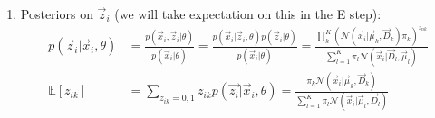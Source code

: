 \documentclass[12pt,twoside]{article}
\begin{document}
\begin{enumerate}
\item Posteriors on $\vec{z}_i$  (we will take expectation on this in the E step):
\begin{align*}
p(\vec{z}_i \vert \vec{x}_i, \theta)
&= \frac{p(\vec{x}_i, \vec{z}_i \vert \theta)}{p(\vec{x}_i \vert \theta)}
= \frac{p(\vec{x}_i\vert \vec{z}_i, \theta)p(\vec{z}_i \vert \theta)}{p(\vec{x}_i \vert \theta)}
= \frac{\prod_k^K \left(\mathcal{N}(\vec{x}_i \vert \vec{\mu}_k, \vec{D}_k)\pi_k\right)^{z_{nk}}}{\sum_{l =1}^K \pi_l \mathcal{N}(\vec{x}_i \vert \vec{D}_l, \vec{\mu}_l)}\\
\mathbb{E}[z_{ik}] & = \sum_{z_{ik}=0,1} z_{ik} p(\vec{z_i}\vert \vec{x}_i, \theta)
= \frac{\pi_k\mathcal{N}(\vec{x}_i \vert \vec{\mu}_k, \vec{D}_k)}{\sum_{l=1}^K \pi_l\mathcal{N}(\vec{x}_i \vert \vec{\mu}_l, \vec{D}_l)}
\end{align*}

\end{enumerate}
\end{document}
